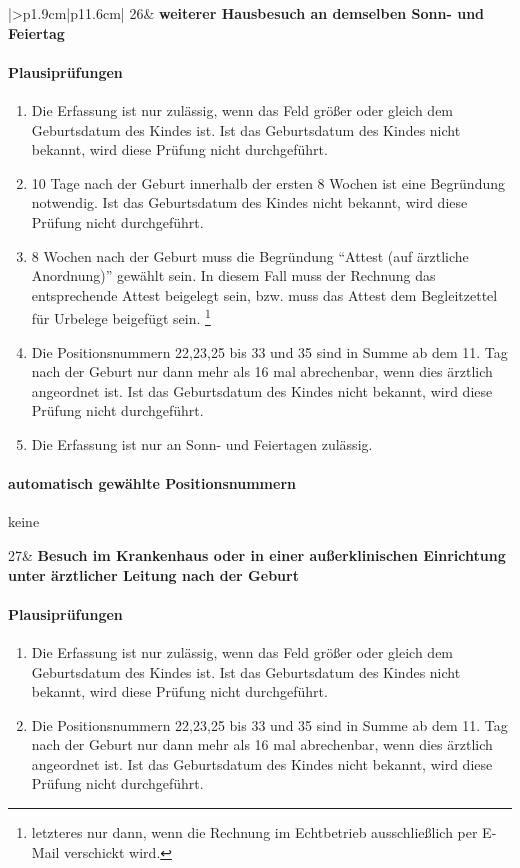 \begin{mpsupertabular}{|>{\centering}p{1.9cm}|p{11.6cm}|}
26&
\textbf{weiterer Hausbesuch an demselben Sonn- und Feiertag}
\paragraph{Plausiprüfungen}
\begin{enumerate}
\item
Die Erfassung ist nur zulässig, wenn das Feld  größer 
oder gleich dem Geburtsdatum des Kindes ist. Ist das Geburtsdatum des
Kindes nicht bekannt, wird diese Prüfung nicht durchgeführt.
\item
10 Tage nach der Geburt innerhalb der ersten 8 Wochen ist eine
Begründung notwendig. Ist das Geburtsdatum des
Kindes nicht bekannt, wird diese Prüfung nicht durchgeführt.
\item
8 Wochen nach der Geburt muss die Begründung ``Attest (auf ärztliche
Anordnung)'' gewählt sein. In diesem Fall muss der Rechnung das
entsprechende Attest beigelegt sein, bzw. muss das Attest dem
Begleitzettel für Urbelege beigefügt sein.
\footnote{letzteres nur dann, wenn die Rechnung im Echtbetrieb
ausschließlich per E-Mail verschickt wird.}
\item
Die Positionsnummern 22,23,25 bis 33 und 35 sind in Summe ab dem 11. Tag 
nach der Geburt nur dann mehr 
als 16 mal abrechenbar, wenn dies ärztlich angeordnet ist.
 Ist das Geburtsdatum des
Kindes nicht bekannt, wird diese Prüfung nicht durchgeführt.
\item
Die Erfassung ist nur an Sonn- und Feiertagen zulässig.
\end{enumerate}
\paragraph{automatisch gewählte Positionsnummern}
keine
\\ \hline


27&
\textbf{Besuch im Krankenhaus oder in einer außerklinischen Einrichtung
unter ärztlicher Leitung nach der Geburt}
\paragraph{Plausiprüfungen}
\begin{enumerate}
\item
Die Erfassung ist nur zulässig, wenn das Feld  größer 
oder gleich dem Geburtsdatum des Kindes ist. Ist das Geburtsdatum des
Kindes nicht bekannt, wird diese Prüfung nicht durchgeführt.
\item
Die Positionsnummern 22,23,25 bis 33 und 35 sind in Summe ab dem 11. Tag 
nach der Geburt nur dann mehr 
als 16 mal abrechenbar, wenn dies ärztlich angeordnet ist.
 Ist das Geburtsdatum des
Kindes nicht bekannt, wird diese Prüfung nicht durchgeführt.
\end{enumerate}

\end{mpsupertabular}
